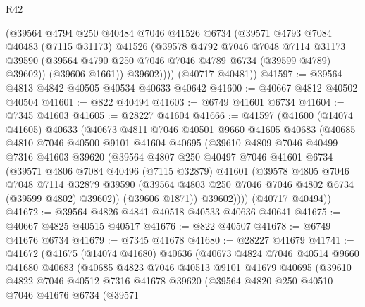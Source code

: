 \begin{lexlean}{R42}
\begin{coremodule}
{            (@39564
              @4794
              @250
              @40484
              @7046
              @41526
              @6734
              (@39571
                @4793
                @7084
                @40483
                (@7115 @31173)
                @41526
                (@39578
                  @4792
                  @7046
                  @7048
                  @7114
                  @31173
                  @39590
                  (@39564 @4790 @250 @7046 @7046 @4789 @6734 (@39599 @4789) @39602))
                (@39606 @1661))
              @39602))))
      (@40717 @40481))
@41597 := @39564 @4813 @4842 @40505 @40534 @40633 @40642
@41600 := @40667 @4812 @40502 @40504
@41601 := @822 @40494
@41603 := @6749 @41601 @6734
@41604 := @7345 @41603
@41605 := @28227 @41604
@41666 := @41597
    (@41600
      (@14074 @41605)
      @40633
      (@40673
        @4811
        @7046
        @40501
        @9660
        @41605
        @40683
        (@40685
          @4810
          @7046
          @40500
          @9101
          @41604
          @40695
          (@39610
            @4809
            @7046
            @40499
            @7316
            @41603
            @39620
            (@39564
              @4807
              @250
              @40497
              @7046
              @41601
              @6734
              (@39571
                @4806
                @7084
                @40496
                (@7115 @32879)
                @41601
                (@39578
                  @4805
                  @7046
                  @7048
                  @7114
                  @32879
                  @39590
                  (@39564 @4803 @250 @7046 @7046 @4802 @6734 (@39599 @4802) @39602))
                (@39606 @1871))
              @39602))))
      (@40717 @40494))
@41672 := @39564 @4826 @4841 @40518 @40533 @40636 @40641
@41675 := @40667 @4825 @40515 @40517
@41676 := @822 @40507
@41678 := @6749 @41676 @6734
@41679 := @7345 @41678
@41680 := @28227 @41679
@41741 := @41672
    (@41675
      (@14074 @41680)
      @40636
      (@40673
        @4824
        @7046
        @40514
        @9660
        @41680
        @40683
        (@40685
          @4823
          @7046
          @40513
          @9101
          @41679
          @40695
          (@39610
            @4822
            @7046
            @40512
            @7316
            @41678
            @39620
            (@39564
              @4820
              @250
              @40510
              @7046
              @41676
              @6734
              (@39571
}
\end{coremodule}
\end{lexlean}
